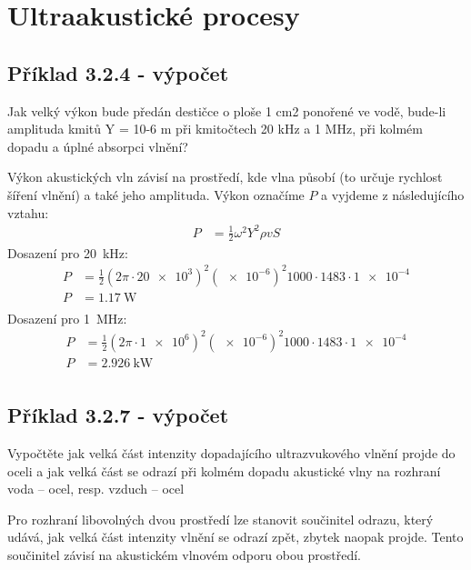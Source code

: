 \section{Ultraakustické procesy}

\subsection{Příklad 3.2.4 - výpočet}
\begin{zadani}
    Jak velký výkon bude předán destičce o ploše 1 cm2 ponořené ve 
    vodě, bude-li amplituda kmitů Y = 10-6 m  při kmitočtech 20 kHz a 
    1 MHz, při kolmém dopadu a úplné absorpci vlnění?
\end{zadani}


Výkon akustických vln závisí na prostředí, kde vlna působí (to určuje rychlost šíření vlnění) a také jeho amplituda. Výkon označíme \(P\) a vyjdeme z následujícího vztahu:
\begin{align*}
    P &= \frac{1}{2}\omega^2 Y^2 \rho vS
\end{align*}
Dosazení pro \qty{20}{kHz}:
\begin{align*}
    P &= \frac{1}{2}(2\pi\cdot \num{20e3})^2 (\num{e-6})^2 \num{1000}\cdot \num{1483}\cdot \num{1e-4} \\
    P &= \qty{1,17}{\watt} \\
\end{align*}
Dosazení pro \qty{1}{MHz}:
\begin{align*}
    P &= \frac{1}{2}(2\pi\cdot \num{1e6})^2 (\num{e-6})^2 \num{1000}\cdot \num{1483}\cdot \num{1e-4} \\
    P &= \qty{2,926}{\kilo\watt} \\
\end{align*}

\subsection{Příklad 3.2.7 - výpočet}
\begin{zadani}
    Vypočtěte jak velká část intenzity dopadajícího ultrazvukového vlnění 
    projde do oceli a jak velká část se odrazí při kolmém dopadu 
    akustické vlny na rozhraní  voda – ocel,  resp.  vzduch – ocel
\end{zadani}


Pro rozhraní libovolných dvou prostředí lze stanovit součinitel odrazu, který udává, jak velká část intenzity vlnění se odrazí zpět, zbytek naopak projde. 
Tento součinitel závisí na akustickém vlnovém odporu obou prostředí. 

